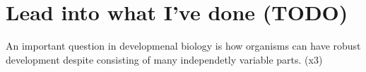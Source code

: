 \section{Lead into what I've done (TODO)}
An important question in developmenal biology is how organisms can have robust
development despite consisting of many independetly variable parts. \CITE (x3)






% 


